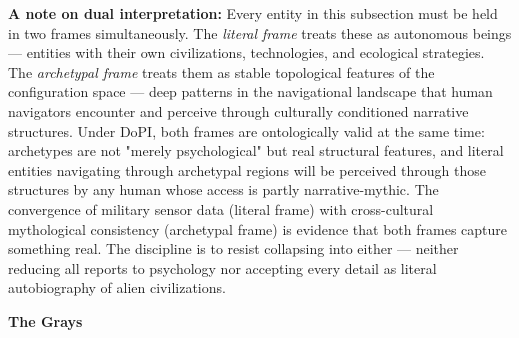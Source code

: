 \textbf{A note on dual interpretation:} Every entity in this subsection must be held in two frames simultaneously. The \textit{literal frame} treats these as autonomous beings — entities with their own civilizations, technologies, and ecological strategies. The \textit{archetypal frame} treats them as stable topological features of the configuration space — deep patterns in the navigational landscape that human navigators encounter and perceive through culturally conditioned narrative structures. Under DoPI, both frames are ontologically valid at the same time: archetypes are not "merely psychological" but real structural features, and literal entities navigating through archetypal regions will be perceived through those structures by any human whose access is partly narrative-mythic. The convergence of military sensor data (literal frame) with cross-cultural mythological consistency (archetypal frame) is evidence that both frames capture something real. The discipline is to resist collapsing into either — neither reducing all reports to psychology nor accepting every detail as literal autobiography of alien civilizations.


\textbf{The Grays}


